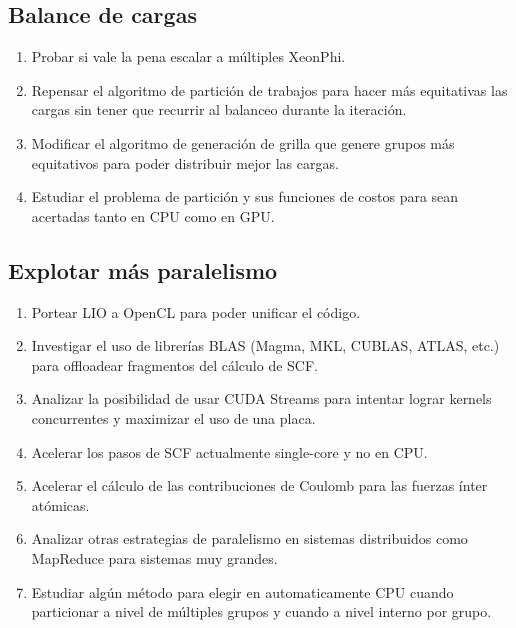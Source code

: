 \subsection{Balance de cargas}
\begin{enumerate}
  \item Probar si vale la pena escalar a m\'ultiples XeonPhi.
  \item Repensar el algoritmo de partici\'on de trabajos para hacer m\'as equitativas las cargas sin
    tener que recurrir al balanceo durante la iteraci\'on.
  \item Modificar el algoritmo de generaci\'on de grilla que genere grupos m\'as equitativos para poder
    distribuir mejor las cargas.
  \item Estudiar el problema de partici\'on y sus funciones de costos para sean acertadas tanto en CPU
    como en GPU.
\end{enumerate}

\subsection{Explotar m\'as paralelismo}
\begin{enumerate}
  \item Portear LIO a OpenCL para poder unificar el c\'odigo.
  \item Investigar el uso de librer\'ias BLAS (Magma, MKL, CUBLAS, ATLAS, etc.) para offloadear fragmentos del
    c\'alculo de SCF.
  \item Analizar la posibilidad de usar CUDA Streams para intentar lograr kernels concurrentes y maximizar
    el uso de una placa.
  \item Acelerar los pasos de SCF actualmente single-core y no en CPU.
  \item Acelerar el c\'alculo de las contribuciones de Coulomb para las fuerzas \'inter at\'omicas.
  \item Analizar otras estrategias de paralelismo en sistemas distribuidos como MapReduce para sistemas muy grandes.
  \item Estudiar alg\'un m\'etodo para elegir en automaticamente CPU cuando particionar a nivel
    de m\'ultiples grupos y cuando a nivel interno por grupo.
\end{enumerate}

